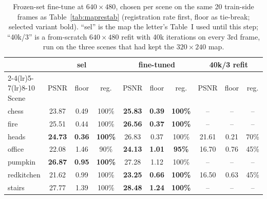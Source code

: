 \documentclass[journal]{IEEEtran}
\begin{document}
\begin{table}[t]
\caption{Frozen-set fine-tune at $640{\times}480$, chosen per scene on the
same 20 train-side frames as Table~\ref{tab:maprestab} (registration rate
first, floor as tie-break; selected variant bold). ``sel'' is the map the
letter's Table~I used until this step; ``40k/3'' is a from-scratch
$640{\times}480$ refit with 40k iterations on every 3rd frame, run on the
three scenes that had kept the $320{\times}240$ map.}
\label{tab:finetune}
\centering\scriptsize
\setlength{\tabcolsep}{3pt}
\begin{tabular}{@{}l ccc ccc ccc@{}}
\toprule
& \multicolumn{3}{c}{sel} & \multicolumn{3}{c}{fine-tuned} & \multicolumn{3}{c}{40k/3 refit} \\
\cmidrule(lr){2-4}\cmidrule(lr){5-7}\cmidrule(lr){8-10}
Scene & PSNR & floor & reg. & PSNR & floor & reg. & PSNR & floor & reg. \\
\midrule
chess      & 23.87 & 0.49 & 100\% & \textbf{25.83} & \textbf{0.39} & \textbf{100\%} & -- & -- & -- \\
fire       & 25.51 & 0.44 & 100\% & \textbf{26.56} & \textbf{0.37} & \textbf{100\%} & -- & -- & -- \\
heads      & \textbf{24.73} & \textbf{0.36} & \textbf{100\%} & 26.83 & 0.37 & 100\% & 21.61 & 0.21 & 70\% \\
office     & 22.08 & 1.46 & 90\% & \textbf{24.13} & \textbf{1.01} & \textbf{95\%} & 16.70 & 0.76 & 45\% \\
pumpkin    & \textbf{26.87} & \textbf{0.95} & \textbf{100\%} & 27.28 & 1.12 & 100\% & -- & -- & -- \\
redkitchen & 21.62 & 0.99 & 100\% & \textbf{23.25} & \textbf{0.66} & \textbf{100\%} & 16.50 & 0.63 & 45\% \\
stairs     & 27.77 & 1.39 & 100\% & \textbf{28.48} & \textbf{1.24} & \textbf{100\%} & -- & -- & -- \\
\bottomrule
\end{tabular}
\end{table}
\end{document}
